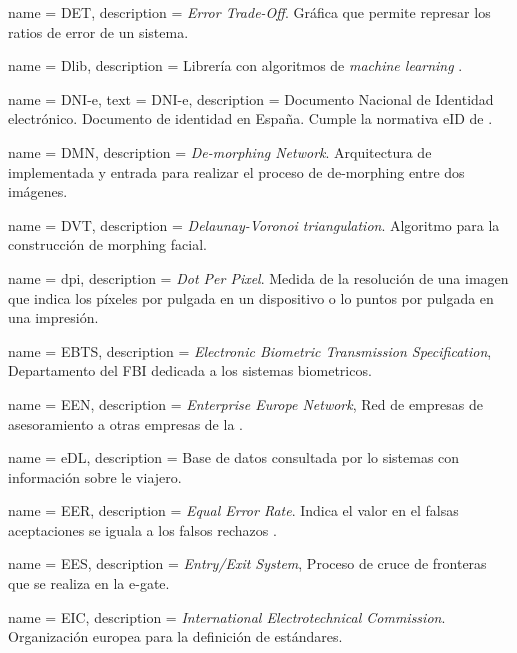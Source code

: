 {
    name        = DET,
    description = {\textit{Error Trade-Off}. Gráfica que permite represar los ratios de error de un sistema.}
}

{
    name        = Dlib,
    description = {Librería con algoritmos de \textit{machine learning} \cite{dlibOnline}.}
}

{
    name        = DNI-e,
    text        = \mbox{DNI-e},
    description = {Documento Nacional de Identidad electrónico. Documento de identidad en España. Cumple la normativa \gls{eID} de  \cite{doc20069303}.}
}

{
    name        = {DMN},
    description = {\textit{De-morphing Network}. Arquitectura de  implementada y entrada para realizar el proceso de \gls{de-morphing} entre dos imágenes.}
}

{
    name        = {DVT},
    description = {\textit{Delaunay-Voronoi triangulation}. Algoritmo para la construcción de \gls{morphing} facial.}
}

{
    name        = {dpi},
    description = {\textit{Dot Per Pixel}. Medida de la resolución de una imagen que indica los píxeles por pulgada en un dispositivo o lo puntos por pulgada en una impresión.}
}

{
    name        = {EBTS},
    description = {\textit{Electronic Biometric Transmission Specification}, Departamento del FBI \cite{FBIBioOnline} dedicada a los sistemas biometricos.}
} 

{
    name        = {EEN},
    description = {\textit{Enterprise Europe Network}, Red de empresas de asesoramiento a otras empresas de la  \cite{EENOnline}.}
}

{
    name        = {eDL},
    description = {Base de datos consultada por lo sistemas  con información sobre le viajero.}
}

{
    name        = {EER},
    description = {\textit{Equal Error Rate}. Indica el valor en el falsas aceptaciones  se iguala a los falsos rechazos .}
}

{
    name        = {EES},
    description = {\textit{Entry/Exit System}, Proceso de cruce de fronteras que se realiza en la \gls{e-gate}.}
}

{
    name        = {EIC},
    description = {\textit{International Electrotechnical Commission}. Organización europea para la definición de estándares.}
}

